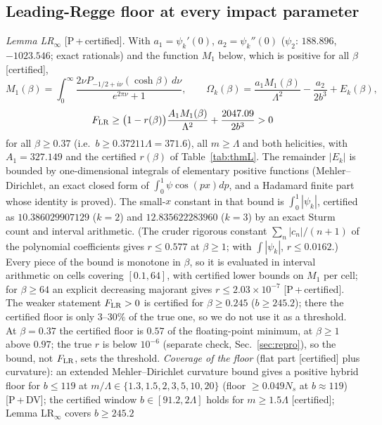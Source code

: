 \documentclass[aps,prl,onecolumn,superscriptaddress,nofootinbib]{revtex4-2}
\begin{document}
\subsection{Leading-Regge floor at every impact parameter}
\emph{Lemma LR$_\infty$} [P\,+\,certified]. With $a_1=\psi_k'(0)$, $a_2=\psi_k''(0)$ ($\psi_2$: $188.896$, $-1023.546$; exact
rationals) and the function $M_1$ below, which is positive for all $\beta$ [certified],
\begin{equation}
M_1(\beta)=\int_0^\infty\frac{2\nu P_{-1/2+i\nu}(\cosh\beta)\,d\nu}{e^{2\pi\nu}+1},\qquad
\Omega_k(\beta)=\frac{a_1M_1(\beta)}{\Lambda^2}-\frac{a_2}{2b^3}+E_k(\beta),
\end{equation}
\begin{equation}
F_{\rm LR}\ge\big(1-r(\beta)\big)\frac{A_1M_1(\beta)}{\Lambda^2}+\frac{2047.09}{2b^3}>0
\label{eq:lrinf}
\end{equation}
for all $\beta\ge0.37$ (i.e.\ $b\ge0.37211\Lambda=371.6$), all $m\ge\Lambda$ and both helicities, with $A_1=327.149$ and
the certified $r(\beta)$ of Table~\ref{tab:thmL}. The remainder $|E_k|$ is bounded by one-dimensional integrals of
elementary positive functions (Mehler--Dirichlet, an exact closed form of $\int_0^1\psi\cos(px)dp$, and a Hadamard finite
part whose identity is proved). The small-$x$ constant in that bound is $\int_0^1|\psi_k|$, certified as
$10.386029907129$ ($k=2$) and $12.835622283960$ ($k=3$) by an exact Sturm count and interval arithmetic. (The cruder rigorous constant $\sum_n|c_n|/(n+1)$ of the
polynomial coefficients gives $r\le0.577$ at $\beta\ge1$; with $\int|\psi_k|$, $r\le0.0162$.) Every piece of the bound is monotone in $\beta$, so it is evaluated in
interval arithmetic on cells covering $[0.1,64]$, with certified lower bounds on $M_1$ per cell; for $\beta\ge64$ an
explicit decreasing majorant gives $r\le2.03\times10^{-7}$ [P\,+\,certified]. The weaker statement $F_{\rm LR}>0$ is
certified for $\beta\ge0.245$ ($b\ge245.2$); there the certified floor is only $3$--$30\%$ of the true one, so we do not
use it as a threshold. At $\beta=0.37$ the certified floor is $0.57$ of the floating-point minimum, at $\beta\ge1$ above
$0.97$; the true $r$ is below $10^{-6}$ (separate check, Sec.~\ref{sec:repro}), so the bound, not $F_{\rm LR}$, sets the threshold.
\emph{Coverage of the floor} (flat part [certified] plus curvature): an extended Mehler--Dirichlet curvature bound gives a
positive hybrid floor for $b\le119$ at $m/\Lambda\in\{1.3,1.5,2,3,5,10,20\}$ (floor $\ge0.049N_s$ at $b\approx119$) [P\,+\,DV]; the
certified window $b\in[91.2,2\Lambda]$ holds for $m\ge1.5\Lambda$ [certified]; Lemma LR$_\infty$ covers $b\ge245.2$
\end{document}
